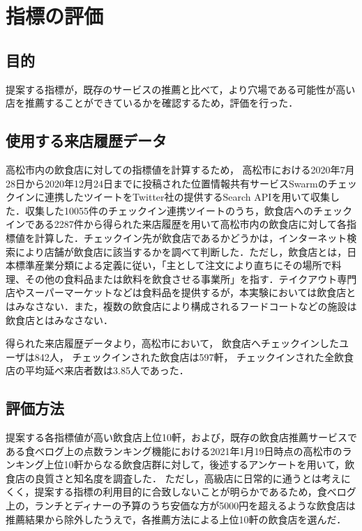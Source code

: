 \chapter{指標の評価}



\label{chap:experiment}

\section{目的}
提案する指標が，既存のサービスの推薦と比べて，より穴場である可能性が高い店を推薦することができているかを確認するため，評価を行った．

\section{使用する来店履歴データ}
高松市内の飲食店に対しての指標値を計算するため，
高松市における2020年7月28日から2020年12月24日までに投稿された位置情報共有サービスSwarmのチェックインに連携したツイートをTwitter社の提供するSearch APIを用いて収集した．収集した10055件のチェックイン連携ツイートのうち，飲食店へのチェックインである2287件から得られた来店履歴を用いて高松市内の飲食店に対して各指標値を計算した．チェックイン先が飲食店であるかどうかは，インターネット検索により店舗が飲食店に該当するかを調べて判断した．ただし，飲食店とは，日本標準産業分類による定義\cite{restaurant}に従い，「主として注文により直ちにその場所で料理、その他の食料品または飲料を飲食させる事業所」を指す．テイクアウト専門店やスーパーマーケットなどは食料品を提供するが，本実験においては飲食店とはみなさない．また，複数の飲食店により構成されるフードコートなどの施設は飲食店とはみなさない．\par
得られた来店履歴データより，高松市において，
飲食店へチェックインしたユーザは842人，
チェックインされた飲食店は597軒，
チェックインされた全飲食店の平均延べ来店者数は3.85人であった．

\section{評価方法}
提案する各指標値が高い飲食店上位10軒，および，既存の飲食店推薦サービスである食べログ上の点数ランキング機能における2021年1月19日時点の高松市のランキング上位10軒からなる飲食店群に対して，後述するアンケートを用いて，飲食店の良質さと知名度を調査した．
ただし，高級店に日常的に通うとは考えにくく，提案する指標の利用目的に合致しないことが明らかであるため，食べログ上の，ランチとディナーの予算のうち安価な方が5000円を超えるような飲食店は推薦結果から除外したうえで，各推薦方法による上位10軒の飲食店を選んだ．

